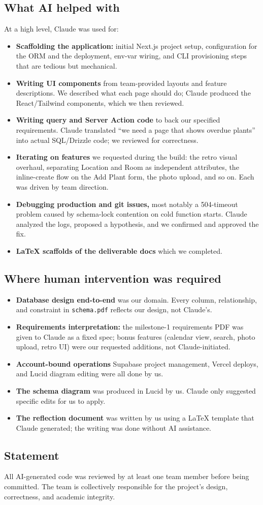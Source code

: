\documentclass[11pt]{article}
\begin{document}
\subsection*{What AI helped with}
At a high level, Claude was used for:
\begin{itemize}[leftmargin=*]
  \item \textbf{Scaffolding the application:} initial Next.js project setup,
    configuration for the ORM and the deployment, env-var wiring, and CLI
    provisioning steps that are tedious but mechanical.
  \item \textbf{Writing UI components} from team-provided layouts and feature
    descriptions. We described what each page should do; Claude
    produced the React/Tailwind components, which we then reviewed.
  \item \textbf{Writing query and Server Action code} to back our specified
    requirements. Claude translated ``we need a page that shows overdue
    plants'' into actual SQL/Drizzle code; we reviewed for
    correctness.
  \item \textbf{Iterating on features} we requested during the build: the
    retro visual overhaul, separating Location and Room as independent
    attributes, the inline-create flow on the Add Plant form, the photo
    upload, and so on. Each was driven by team direction.
  \item \textbf{Debugging production and git issues,} most notably a 504-timeout problem
    caused by schema-lock contention on cold function starts. Claude
    analyzed the logs, proposed a hypothesis, and we confirmed and
    approved the fix.
  \item \textbf{\LaTeX{} scaffolds of the deliverable docs} which we completed.
\end{itemize}
\subsection*{Where human intervention was required}
\begin{itemize}[leftmargin=*]
  \item \textbf{Database design end-to-end} was our domain. Every column,
    relationship, and constraint in \texttt{schema.pdf} reflects our design,
    not Claude's.
  \item \textbf{Requirements interpretation:} the milestone-1 requirements PDF was
    given to Claude as a fixed spec; bonus features (calendar view, search,
    photo upload, retro UI) were our requested additions, not
    Claude-initiated.
  \item \textbf{Account-bound operations} Supabase project management, Vercel
    deploys, and Lucid diagram editing were all done by us.
  \item \textbf{The schema diagram} was produced in Lucid by us. Claude only
    suggested specific edits for us to apply.
  \item \textbf{The reflection document} was written by us using a \LaTeX{} template that Claude generated; the writing was done without AI assistance.
\end{itemize}
\subsection*{Statement}
All AI-generated code was reviewed by at least one team member before
being committed. The team is collectively responsible for the project's
design, correctness, and academic integrity.
\end{document}
